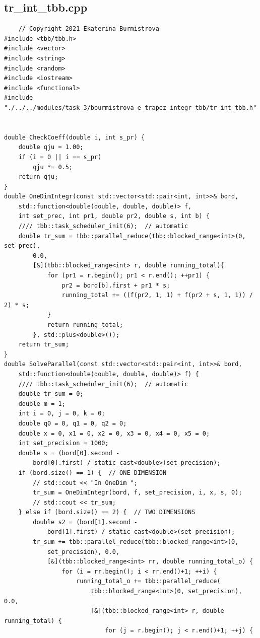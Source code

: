 \documentclass{report}
\begin{document}
  	\subsection*{tr\_int\_tbb.cpp}
 	\begin{verbatim}
 	// Copyright 2021 Ekaterina Burmistrova
#include <tbb/tbb.h>
#include <vector>
#include <string>
#include <random>
#include <iostream>
#include <functional>
#include "./../../modules/task_3/bourmistrova_e_trapez_integr_tbb/tr_int_tbb.h"


double CheckCoeff(double i, int s_pr) {
    double qju = 1.00;
    if (i = 0 || i == s_pr)
        qju *= 0.5;
    return qju;
}
double OneDimIntegr(const std::vector<std::pair<int, int>>& bord,
    std::function<double(double, double, double)> f,
    int set_prec, int pr1, double pr2, double s, int b) {
    //// tbb::task_scheduler_init(6);  // automatic
    double tr_sum = tbb::parallel_reduce(tbb::blocked_range<int>(0, set_prec),
        0.0,
        [&](tbb::blocked_range<int> r, double running_total){
            for (pr1 = r.begin(); pr1 < r.end(); ++pr1) {
                pr2 = bord[b].first + pr1 * s;
                running_total += ((f(pr2, 1, 1) + f(pr2 + s, 1, 1)) / 2) * s;
            }
            return running_total;
        }, std::plus<double>());
    return tr_sum;
}
double SolveParallel(const std::vector<std::pair<int, int>>& bord,
    std::function<double(double, double, double)> f) {
    //// tbb::task_scheduler_init(6);  // automatic
    double tr_sum = 0;
    double m = 1;
    int i = 0, j = 0, k = 0;
    double q0 = 0, q1 = 0, q2 = 0;
    double x = 0, x1 = 0, x2 = 0, x3 = 0, x4 = 0, x5 = 0;
    int set_precision = 1000;
    double s = (bord[0].second -
        bord[0].first) / static_cast<double>(set_precision);
    if (bord.size() == 1) {  // ONE DIMENSION
        // std::cout << "In OneDim ";
        tr_sum = OneDimIntegr(bord, f, set_precision, i, x, s, 0);
        // std::cout << tr_sum;
    } else if (bord.size() == 2) {  // TWO DIMENSIONS
        double s2 = (bord[1].second -
            bord[1].first) / static_cast<double>(set_precision);
        tr_sum += tbb::parallel_reduce(tbb::blocked_range<int>(0,
            set_precision), 0.0,
            [&](tbb::blocked_range<int> rr, double running_total_o) {
                for (i = rr.begin(); i < rr.end()+1; ++i) {
                    running_total_o += tbb::parallel_reduce(
                        tbb::blocked_range<int>(0, set_precision), 0.0,
                        [&](tbb::blocked_range<int> r, double running_total) {
                            for (j = r.begin(); j < r.end()+1; ++j) {

\end{verbatim}
\end{document}
